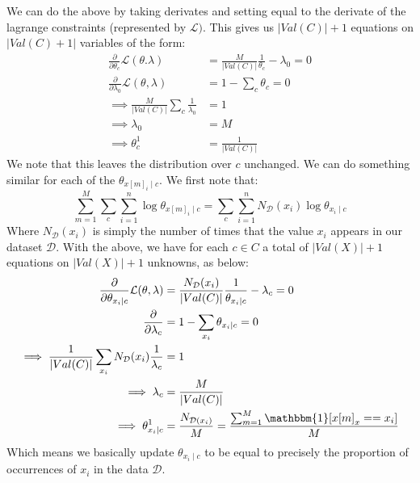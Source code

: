 \documentclass[12pt]{article}
\begin{document}
\begin{enumerate}[label=(\alph*)]
  We can do the above by taking derivates and setting equal to the derivate of the lagrange constraints (represented by $\mathcal{L})$. This gives us $|Val(C)| + 1$ equations on $|Val(C) + 1|$ variables of the form:
  \begin{align*}
    \frac{\partial}{\partial \theta_c} \mathcal{L}(\theta. \lambda) &=  \frac{M}{|Val(C)|}\frac{1}{\theta_c} - \lambda_0 = 0\\
    \frac{\partial}{\partial \lambda_0} \mathcal{L}(\theta, \lambda) &=1- \sum_{c}\theta_c = 0 \\
    \implies \frac{M}{|Val(C)|}\sum_c \frac{1}{\lambda_0} &= 1 \\
    \implies \lambda_0 &= M \\
    \implies \theta_c^1 &= \frac{1}{|Val(C)|}
  \end{align*}
  We note that this leaves the distribution over $c$ unchanged. We can do something similar for each of the $\theta_{x[m]_i \mid c}$. We first note that:
  $$
    \sum_{m=1}^M \sum_c \sum_{i=1}^n \log \theta_{x[m]_i \mid c} = \sum_c \sum_{i=1}^n N_{\mathcal{D}}(x_i) \log\theta_{x_i \mid c}
  $$
  Where $N_{\mathcal{D}}(x_i)$ is simply the number of times that the value $x_i$ appears in our dataset $\mathcal{D}$. With the above, we have for each $c \in C$ a total of $|Val(X)| + 1$ equations on $|Val(X)| + 1$ unknowns, as below:
  \begin{align*}
    \frac{\partial}{\partial \theta_{x_i \mid c}} \mathcal{L}(\theta, \lambda) &= \frac{N_{\mathcal{D}}(x_i)}{|Val(C)|} \frac{1}{\theta_{x_i \mid c}} - \lambda_c = 0 \\
    \frac{\partial}{\partial \lambda_c} &= 1 - \sum_{x_i} \theta_{x_i \mid c} = 0 \\
    \implies \frac{1}{|Val(C)|}\sum_{x_i} N_{\mathcal{D}}(x_i)\frac{1}{\lambda_c} &= 1 \\
    \implies \lambda_c &= \frac{M}{|Val(C)|} \\
    \implies \theta_{x_i \mid c}^1 &= \frac{N_{\mathcal{D}(x_i)}}{M} = \frac{\sum_{m=1}^M \mathbbm{1}[x[m]_x == x_i]}{M}
  \end{align*}
  Which means we basically update $\theta_{x_i \mid c}$ to be equal to precisely the proportion of occurrences of $x_i$ in the data $\mathcal{D}$.


\end{enumerate}
\end{document}
